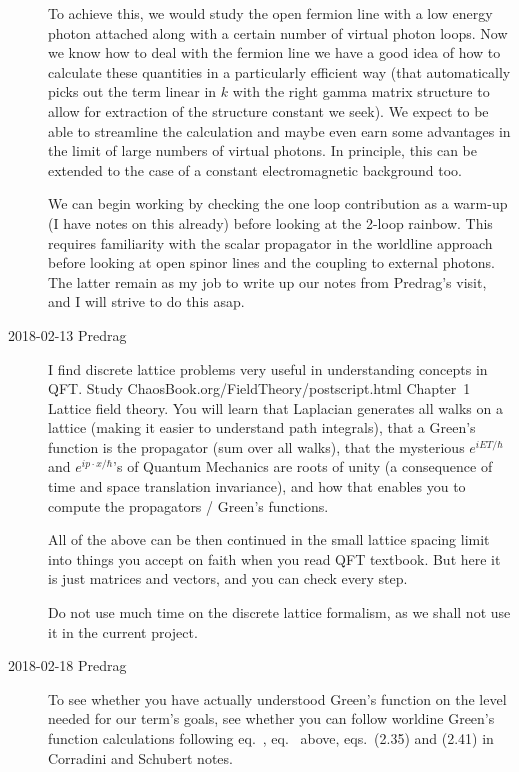 \begin{description}
To achieve this, we would study the open fermion line with a low energy
photon attached along with a certain number of virtual photon loops.
Now we know how to deal with the fermion line we have a good idea
of how to calculate these quantities in a particularly efficient way
(that automatically picks out the term linear in $k$ with the right gamma
matrix structure to allow for extraction of the structure constant we
seek). We expect to be able to streamline the calculation  and maybe even
earn some advantages in the limit of large numbers of virtual photons. In
principle, this can be extended to the case of a constant electromagnetic
background too.

We can begin working by checking the one loop contribution as a warm-up
(I have notes on this already) before looking at the 2-loop rainbow. This
requires familiarity with the scalar propagator in the worldline approach
before looking at open spinor lines and the coupling to external photons.
The latter remain as my job to write up our notes from Predrag's visit,
and I will strive to do this asap.

\item[2018-02-13 Predrag]
    I find discrete lattice problems very useful in understanding
    concepts in QFT. Study
    {ChaosBook.org/FieldTheory/postscript.html} Chapter~1 {Lattice field
    theory}. You will learn that Laplacian generates all walks on a
    lattice (making it easier to understand path integrals), that a
    Green's function is the propagator (sum over all walks), that the
    mysterious $e^{iET/\hbar}$ and $e^{ip\cdot{x}/\hbar}$'s of Quantum
    Mechanics are roots of unity (a consequence of time and space
    translation invariance), and how that enables you to compute the
    propagators / Green's functions.

    All of the above can be then continued in the small lattice spacing
    limit into things you accept on faith when you read QFT textbook.
    But here it is just matrices and vectors, and you can check every
    step.

    Do not use much time on the discrete lattice formalism, as we shall
    not use it in the current project.

\item[2018-02-18 Predrag] To see whether you have actually understood
Green's function on the level needed for our term's goals, see whether
you can follow worldine Green's function calculations following
eq.~, eq.~ above, eqs.~(2.35)
and (2.41) in Corradini and Schubert notes.


\end{description}
